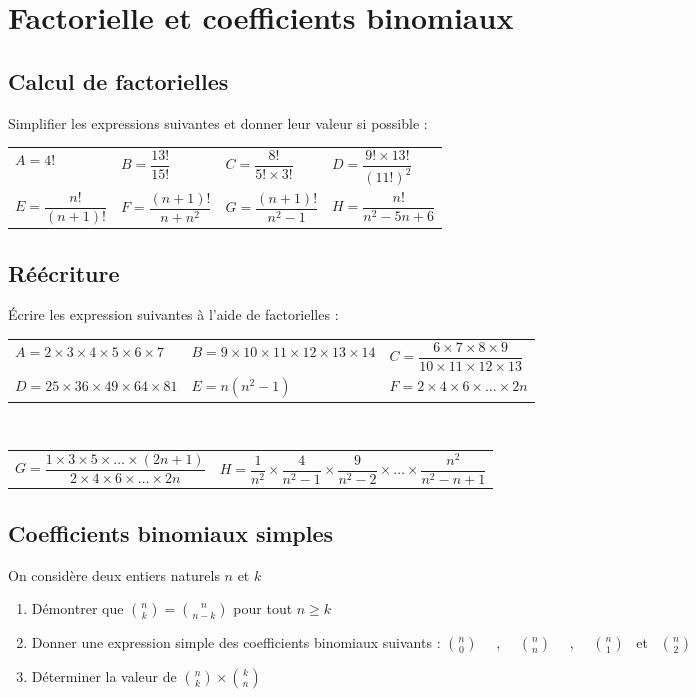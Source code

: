 \documentclass[oneside,12pt]{article}          %
\begin{document}
\section{Factorielle et coefficients binomiaux}

\subsection{Calcul de factorielles}
Simplifier les expressions suivantes et donner leur valeur si possible :

\renewcommand{\arraystretch}{2}
\begin{tabular}{p{}p{}p{}p{}}
    $A=4!$ & $B=\dfrac{13!}{15!}$ & $C=\dfrac{8!}{5!\times3!}$ & $D=\dfrac{9!\times13!}{(11!)^2}$\\
    $E=\dfrac{n!}{(n+1)!}$ & $F=\dfrac{(n+1)!}{n+n^2}$ & $G=\dfrac{(n+1)!}{n^2-1}$ & $H=\dfrac{n!}{n^2-5n+6}$
\end{tabular}



\subsection{Réécriture}
Écrire les expression suivantes à l'aide de factorielles :

\begin{tabular}{p{}p{}p{}}
    $A=2\times3\times4\times5\times6\times7$ & $B=9\times10\times11\times12\times13\times14$ & $C=\dfrac{6\times7\times8\times9}{10\times11\times12\times13}$\\
    $D=25\times36\times49\times64\times81$ & $E=n(n^2-1)$ & $F=2\times4\times6\times\ldots\times2n$\\
\end{tabular}\\
\begin{tabular}{p{}p{}}
    $G=\dfrac{1\times3\times5\times\ldots\times(2n+1)}{2\times4\times6\times\ldots\times2n}$ & $H=\dfrac{1}{n^2}\times\dfrac{4}{n^2-1}\times\dfrac{9}{n^2-2}\times\ldots\times\dfrac{n^2}{n^2-n+1}$    
\end{tabular}



\subsection{Coefficients binomiaux simples}
On considère deux entiers naturels $n$ et $k$
\begin{enumerate}
    \item Démontrer que $\binom{n}{k}=\binom{n}{n-k}$ pour tout $n\geq k$
    \item Donner une expression simple des coefficients binomiaux suivants : $\binom{n}{0}$ ~~,~~ $\binom{n}{n}$ ~~,~~ $\binom{n}{1}$ ~et~ $\binom{n}{2}$
    \item Déterminer la valeur de $\binom{n}{k}\times\binom{k}{n}$
\end{enumerate}
\end{document}
